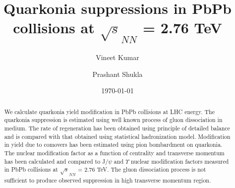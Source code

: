 \documentclass[aps,prc,preprint,superscriptaddress,showpacs,showkeys]{revtex4-1}
\begin{document}
\title{{\Large Quarkonia suppressions in PbPb collisions at $\sqrt s_{NN}$ =  2.76 TeV }}
\author{\large Vineet Kumar}
\author{\large Prashant Shukla}
\date{\today}


\begin{abstract}
We calculate quarkonia yield modification in PbPb collisions at LHC energy.
The quarkonia suppression is estimated using well known 
process of gluon dissociation in medium. The rate of regeneration has been obtained 
using principle of detailed balance and is compared with that obtained using statistical hadronization 
model. Modification in yield due to comovers has been estimated using pion bombardment on quarkonia.  
  The nuclear modification factor as a function of centrality and transverse momentum has been calculated  
and compared to J/$\psi$ and $\Upsilon$ nuclear modification factors measured in PbPb collisions 
at $\sqrt s_{NN}$ =  2.76 TeV. The gluon dissociation process is not sufficient to produce observed suppression
in high transverse momentum region.
\end{abstract}

\maketitle
\end{document}
